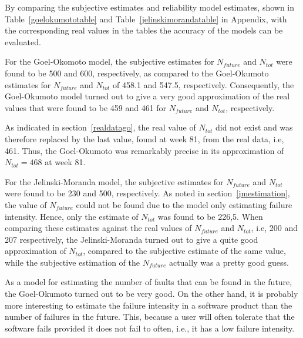 By comparing the subjective estimates and reliability model estimates, shown in Table~\ref{goelokumototable} and Table~\ref{jelinskimorandatable} in Appendix, with the corresponding real values in the tables the accuracy of the models can be evaluated. 

For the Goel-Okomoto model, the subjective estimates for $N_{future}$ and $N_{tot}$ were found to be 500 and 600, respectively, as compared to the Goel-Okumoto estimates for $N_{future}$ and $N_{tot}$ of 458.1 and 547.5, respectively. Consequently, the Goel-Okumoto model turned out to give a very good approximation of the real values that were found to be 459 and 461 for $N_{future}$ and $N_{tot}$, respectively. 

\noindent As indicated in section~\ref{realdatago}, the real value of $N_{tot}$ did not exist and was therefore replaced by the last value, found at week 81, from the real data, i.e, 461. Thus, the Goel-Okumoto was remarkably precise in its approximation of $N_{tot}=468$ at week 81. 

For the Jelinski-Moranda model, the subjective estimates for $N_{future}$ and $N_{tot}$ were found to be 230 and 500, respectively. As noted in section~\ref{jmestimation}, the value of $N_{future}$ could not be found due to the model only estimating failure intensity. Hence, only the estimate of $N_{tot}$ was found to be 226,5. When comparing these estimates against the real values of $N_{future}$ and $N_{tot}$, i.e, 200 and 207 respectively, the Jelinski-Moranda turned out to give a quite good approximation of $N_{tot}$, compared to the subjective estimate of the same value, while the subjective estimation of the $N_{future}$ actually was a pretty good guess. 

As a model for estimating the number of faults that can be found in the future, the Goel-Okumoto turned out to be very good. On the other hand, it is probably more interesting to estimate the failure intensity in a software product than the number of failures in the future. This, because a user will often tolerate that the software fails provided it does not fail to often, i.e., it has a low failure intensity.